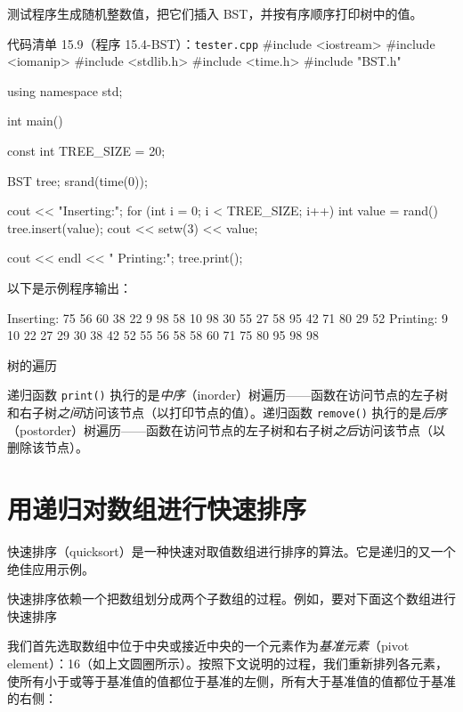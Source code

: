 测试程序生成随机整数值，把它们插入 BST，并按有序顺序打印树中的值。

\begin{codeboxt}{代码清单 15.9（程序 15.4-BST）：\texttt{tester.\allowbreak{}cpp}}
#include <iostream>
#include <iomanip>
#include <stdlib.h>
#include <time.h>
#include "BST.h"

using namespace std;

int main()
{
    const int TREE_SIZE = 20;

    BST tree;
    srand(time(0));

    cout << "Inserting:";
    for (int i = 0; i < TREE_SIZE; i++)
    {
        int value = rand()%
        tree.insert(value);
        cout << setw(3) << value;
    }

    cout << endl << " Printing:";
    tree.print();
}
\end{codeboxt}

以下是示例程序输出：

\begin{codebox}
Inserting: 75 56 60 38 22  9 98 58 10 98 30 55 27 58 95 42 71 80 29 52
 Printing:  9 10 22 27 29 30 38 42 52 55 56 58 58 60 71 75 80 95 98 98
\end{codebox}

\begin{mySidebar}{树的遍历}

递归函数 \texttt{print()} 执行的是\emph{中序}（inorder）树遍历——函数在访问节点的左子树和右子树\emph{之间}访问该节点（以打印节点的值）。递归函数 \texttt{remove()} 执行的是\emph{后序}（postorder）树遍历——函数在访问节点的左子树和右子树\emph{之后}访问该节点（以删除该节点）。
\end{mySidebar}


\section{用递归对数组进行快速排序}

快速排序（quicksort）是一种快速对取值数组进行排序的算法。它是递归的又一个绝佳应用示例。

快速排序依赖一个把数组划分成两个子数组的过程。例如，要对下面这个数组进行快速排序


我们首先选取数组中位于中央或接近中央的一个元素作为\emph{基准元素}（pivot element）：16（如上文圆圈所示）。按照下文说明的过程，我们重新排列各元素，使所有小于或等于基准值的值都位于基准的左侧，所有大于基准值的值都位于基准的右侧：

